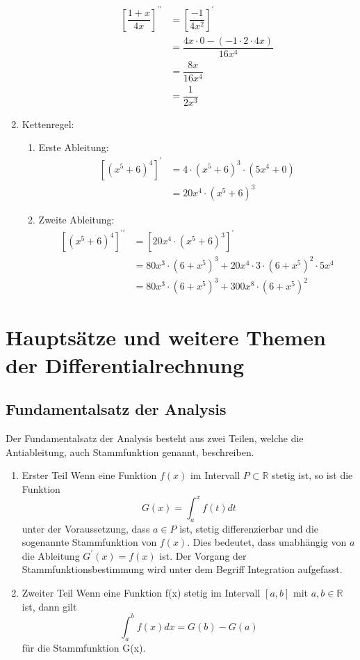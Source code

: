 \documentclass[11pt, a4paper]{report}
\begin{document}
\begin{enumerate}
\begin{enumerate}
\begin{align*}
				\left[ \dfrac{1+x}{4x} \right]^{\prime\prime} &= \left[ \dfrac{-1}{4x^{2}} \right]^{\prime}\\
				&= \dfrac{4x \cdot 0 - (-1 \cdot 2 \cdot 4x)}{16x^{4}}\\
				&= \dfrac{8x}{16x^{4}}\\
				&= \dfrac{1}{2x^{3}}
				\end{align*}
		\end{enumerate}
	\item Kettenregel:
		\begin{enumerate}
			\item Erste Ableitung:
				\begin{align*}
				\left[ (x^{5}+6)^{4} \right]^{\prime} &= 4 \cdot (x^{5}+6)^{3} \cdot (5x^{4}+0) \\
				&= 20x^{4} \cdot (x^{5}+6)^{3}
				\end{align*}
			\item Zweite Ableitung:
				\begin{align*}
				\left[ (x^{5}+6)^{4} \right]^{\prime\prime} &= \left[ 20x^{4} \cdot (x^{5}+6)^{3} \right]^{\prime} \\
				&= 80x^{3} \cdot (6+x^{5})^{3}+20x^{4} \cdot 3 \cdot (6+x^{5})^{2} \cdot 5x^{4}\\
				&= 80x^{3} \cdot (6+x^{5})^{3} + 300x^{8} \cdot (6+x^{5})^{2}
				\end{align*}
		\end{enumerate}
\end{enumerate}
\clearpage


\chapter{Hauptsätze und weitere Themen der Differentialrechnung}
\section*{Fundamentalsatz der Analysis}
Der Fundamentalsatz der Analysis besteht aus zwei Teilen, welche die Antiableitung, auch Stammfunktion genannt, beschreiben.
\begin{enumerate}
\item Erster Teil \cite[Seite 392]{Stewart.2015}
Wenn eine Funktion $f(x)$ im Intervall $P \subset \mathbb{R}$ stetig ist, so ist die Funktion 
\begin{equation}
G(x)=\int_{a}^{x}f(t)dt
\end{equation}
unter der Voraussetzung, dass $a \in P$ ist, stetig differenzierbar und die sogenannte Stammfunktion von $f(x)$. Dies bedeutet, dass unabhängig von $a$ die Ableitung $G^{\prime}(x)= f(x)$ ist. Der Vorgang der Stammfunktionsbestimmung wird unter dem Begriff Integration aufgefasst.
\item Zweiter Teil \cite[396]{Stewart.2015}
Wenn eine Funktion f(x) stetig im Intervall $\left[ a,b \right]$ mit $a,b \in \mathbb{R}$ ist, dann gilt 
\begin{equation}
\int_{a}^{b}f(x)dx=G(b)-G(a)
\end{equation}
für die Stammfunktion G(x).
\end{enumerate}
\end{document}
